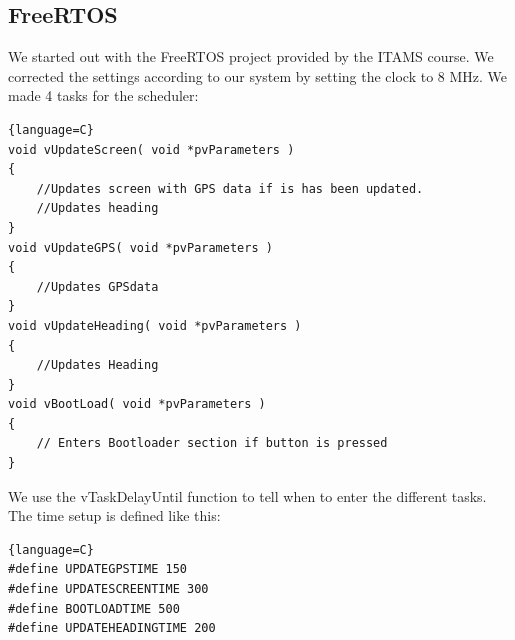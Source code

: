 \subsection{FreeRTOS}
We started out with the FreeRTOS project provided by the ITAMS course. We corrected the settings according to our system by setting the clock to 8 MHz.  We made 4 tasks for the scheduler:
\begin{lstlisting}{language=C}
void vUpdateScreen( void *pvParameters )
{
	//Updates screen with GPS data if is has been updated.
	//Updates heading
}
void vUpdateGPS( void *pvParameters )
{
	//Updates GPSdata
}
void vUpdateHeading( void *pvParameters )
{
	//Updates Heading
}
void vBootLoad( void *pvParameters )
{
	// Enters Bootloader section if button is pressed
}
\end{lstlisting}
We use the vTaskDelayUntil function to tell when to enter the different tasks. The time setup is defined like this:\\
\begin{lstlisting}{language=C}
#define UPDATEGPSTIME 150
#define UPDATESCREENTIME 300
#define BOOTLOADTIME 500
#define UPDATEHEADINGTIME 200
\end{lstlisting}



